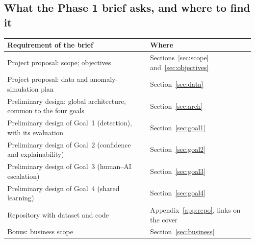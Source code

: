 \documentclass[10pt,a4paper]{article}
\let\oldsubsection\subsection
\renewcommand{\subsection}{\needspace{6\baselineskip}\oldsubsection}
\newcommand{\hdr}{\rowcolor{black!12}}
\begin{document}
\subsection*{What the Phase 1 brief asks, and where to find it}
\begin{table}[!h]
\small\centering
\begin{tabularx}{\textwidth}{@{}Yl@{}}
\toprule
\hdr \textbf{Requirement of the brief} & \textbf{Where}\\
\midrule
Project proposal: scope; objectives & Sections~\ref{sec:scope} and~\ref{sec:objectives}\\
Project proposal: data and anomaly-simulation plan & Section~\ref{sec:data}\\
Preliminary design: global architecture, common to the four goals & Section~\ref{sec:arch}\\
Preliminary design of Goal~1 (detection), with its evaluation & Section~\ref{sec:goal1}\\
Preliminary design of Goal~2 (confidence and explainability) & Section~\ref{sec:goal2}\\
Preliminary design of Goal~3 (human--AI escalation) & Section~\ref{sec:goal3}\\
Preliminary design of Goal~4 (shared learning) & Section~\ref{sec:goal4}\\
Repository with dataset and code & Appendix~\ref{app:repo}, links on the cover\\
Bonus: business scope & Section~\ref{sec:business}\\
\bottomrule
\end{tabularx}
\end{table}

\clearpage
\tableofcontents

\clearpage


\clearpage

\clearpage

\clearpage

\clearpage

\clearpage

\clearpage

\clearpage


\appendix


\end{document}
